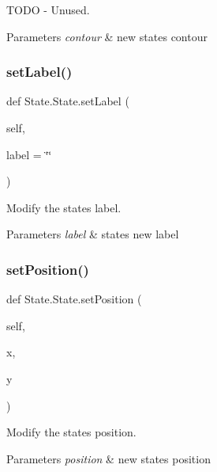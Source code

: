T\+O\+DO -\/ Unused. 


\begin{DoxyParams}{Parameters}
{\em contour} & new state\textquotesingle{}s contour \\
\hline
\end{DoxyParams}
\mbox{\label{classState_1_1State_a4cf3c389c5240bf94c31ea95567c8ccd}} 
\subsubsection{\texorpdfstring{setLabel()}{setLabel()}}
{\footnotesize\ttfamily def State.\+State.\+set\+Label (\begin{DoxyParamCaption}\item[{}]{self,  }\item[{}]{label = {\ttfamily \char`\"{}\char`\"{}} }\end{DoxyParamCaption})}



Modify the state\textquotesingle{}s label. 


\begin{DoxyParams}{Parameters}
{\em label} & state\textquotesingle{}s new label \\
\hline
\end{DoxyParams}
\mbox{\label{classState_1_1State_ab03eca69f6193adba38e0d0c975f829a}} 
\subsubsection{\texorpdfstring{setPosition()}{setPosition()}}
{\footnotesize\ttfamily def State.\+State.\+set\+Position (\begin{DoxyParamCaption}\item[{}]{self,  }\item[{}]{x,  }\item[{}]{y }\end{DoxyParamCaption})}



Modify the state\textquotesingle{}s position. 


\begin{DoxyParams}{Parameters}
{\em position} & new state\textquotesingle{}s position \\
\hline
\end{DoxyParams}
\mbox{\label{classState_1_1State_adc1a8f9b4fbb09c6c3b7f410d06adf42}} 
